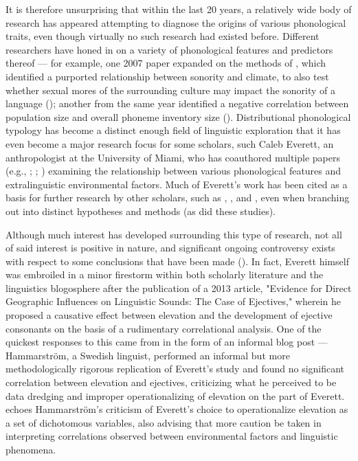 \documentclass{article}
\begin{document}
It is therefore unsurprising that within the last 20 years, a relatively wide body of research has appeared attempting to diagnose the origins of various phonological traits, even though virtually no such research had existed before. Different researchers have honed in on a variety of phonological features and predictors thereof — for example, one 2007 paper expanded on the methods of \textcite{fought2004}, which identified a purported relationship between sonority and climate, to also test whether sexual mores of the surrounding culture may impact the sonority of a language (\cite{ember2007}); another from the same year identified a negative correlation between population size and overall phoneme inventory size (\cite{hay2007}). Distributional phonological typology has become a distinct enough field of linguistic exploration that it has even become a major research focus for some scholars, such Caleb Everett, an anthropologist at the University of Miami, who has coauthored multiple papers (e.g., \cite{everett2013}; \cite{everett2015}; \cite{everett2016}) examining the relationship between various phonological features and extralinguistic environmental factors. Much of Everett's work has been cited as a basis for further research by other scholars, such as \textcite{bentz2018}, \textcite{dediu2017}, and \textcite{noelle2020}, even when branching out into distinct hypotheses and methods (as did these studies).

Although much interest has developed surrounding this type of research, not all of said interest is positive in nature, and significant ongoing controversy exists with respect to some conclusions that have been made (\cite{ladd2015}). In fact, Everett himself was embroiled in a minor firestorm within both scholarly literature and the linguistics blogosphere after the publication of a 2013 article, "Evidence for Direct Geographic Influences on Linguistic Sounds: The Case of Ejectives," wherein he proposed a causative effect between elevation and the development of ejective consonants on the basis of a rudimentary correlational analysis. One of the quickest responses to this came from \cite{hammarstroem2013} in the form of an informal blog post — Hammarström, a Swedish linguist, performed an informal but more methodologically rigorous replication of Everett's study and found no significant correlation between elevation and ejectives, criticizing what he perceived to be data dredging and improper operationalizing of elevation on the part of Everett. \textcite{haynie2014} echoes Hammarström's criticism of Everett's choice to operationalize elevation as a set of dichotomous variables, also advising that more caution be taken in interpreting correlations observed between environmental factors and linguistic phenomena.
\end{document}
